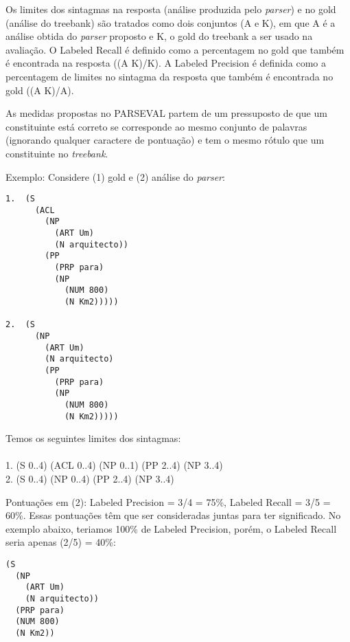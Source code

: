 Os limites dos sintagmas na resposta (análise produzida pelo \emph{parser}) e no gold (análise do treebank) são tratados como dois conjuntos (A e K), em que A é a análise obtida do \emph{parser} proposto e K, o gold do treebank a ser usado na avaliação. O Labeled Recall
é definido como a percentagem no gold que também é encontrada na resposta ((A K)/K). A Labeled Precision é definida como a percentagem de limites no sintagma da resposta que também é encontrada no gold ((A K)/A).

As medidas propostas no PARSEVAL partem de um pressuposto de que um constituinte está correto se corresponde ao mesmo conjunto de palavras (ignorando qualquer caractere de pontuação) e tem o mesmo rótulo que um constituinte no \emph{treebank}.

Exemplo: Considere (1) gold e (2) análise do \emph{parser}:

\begin{center}
\footnotesize
\begin{verbatim}
1.  (S
      (ACL
        (NP
          (ART Um)
          (N arquitecto))
        (PP
          (PRP para)
          (NP
            (NUM 800)
            (N Km2)))))

2.  (S
      (NP
        (ART Um)
        (N arquitecto)
        (PP
          (PRP para)
          (NP
            (NUM 800)
            (N Km2)))))
\end{verbatim}
\end{center}

Temos os seguintes limites dos sintagmas:\\ \\
1. (S 0..4) (ACL 0..4) (NP 0..1) (PP 2..4) (NP 3..4)\\
2. (S 0..4) (NP 0..4) (PP 2..4) (NP 3..4)

Pontuações em (2): Labeled Precision = 3/4 = 75{\%}, Labeled Recall = 3/5 = 60{\%}. Essas pontuações têm que ser consideradas juntas para ter significado. 
No exemplo abaixo, teriamos 100{\%} de Labeled Precision, porém, o Labeled Recall seria apenas (2/5) = 40{\%}:

\begin{center}
\footnotesize
\begin{verbatim}
(S 
  (NP 
    (ART Um) 
    (N arquitecto)) 
  (PRP para) 
  (NUM 800) 
  (N Km2)) 
\end{verbatim}
\end{center}
